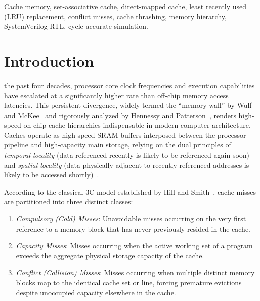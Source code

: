 \documentclass[conference]{IEEEtran}
\begin{document}
\begin{IEEEkeywords}
Cache memory, set-associative cache, direct-mapped cache, least recently used (LRU) replacement, conflict misses, cache thrashing, memory hierarchy, SystemVerilog RTL, cycle-accurate simulation.
\end{IEEEkeywords}

\section{Introduction}
\label{sec:introduction}
 the past four decades, processor core clock frequencies and execution capabilities have escalated at a significantly higher rate than off-chip memory access latencies. This persistent divergence, widely termed the ``memory wall'' by Wulf and McKee~\cite{wulf1995hitting} and rigorously analyzed by Hennessy and Patterson~\cite{hennessy2017computer}, renders high-speed on-chip cache hierarchies indispensable in modern computer architecture. Caches operate as high-speed SRAM buffers interposed between the processor pipeline and high-capacity main storage, relying on the dual principles of \textit{temporal locality} (data referenced recently is likely to be referenced again soon) and \textit{spatial locality} (data physically adjacent to recently referenced addresses is likely to be accessed shortly)~\cite{smith1982cache}.

According to the classical 3C model established by Hill and Smith~\cite{hill1989evaluating}, cache misses are partitioned into three distinct classes:
\begin{enumerate}
    \item \textit{Compulsory (Cold) Misses}: Unavoidable misses occurring on the very first reference to a memory block that has never previously resided in the cache.
    \item \textit{Capacity Misses}: Misses occurring when the active working set of a program exceeds the aggregate physical storage capacity of the cache.
    \item \textit{Conflict (Collision) Misses}: Misses occurring when multiple distinct memory blocks map to the identical cache set or line, forcing premature evictions despite unoccupied capacity elsewhere in the cache.
\end{enumerate}
\end{document}
